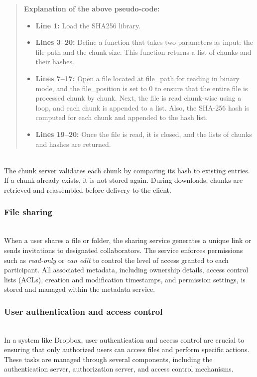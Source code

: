 \begin{quote}
\textbf{Explanation of the above pseudo-code:}

\begin{itemize}
\item
\protect{}\label{BAaoBuXCSsZ3MfwrLSQXN}
\textbf{Line 1:} Load the SHA256 library.
\item
\protect{}\label{hC2IL36w9pmnwTHtZan1t}
\textbf{Lines 3--20:} Define a function that takes two parameters as input: the file path and the chunk size. This function returns a list of chunks and their hashes.
\item
\protect{}\label{2Cv2BSsoccGaYCV5lzb3q}
\textbf{Lines 7--17:} Open a file located at file\_path for reading in binary mode, and the file\_position is set to 0 to ensure that the entire file is processed chunk by chunk. Next, the file is read chunk-wise using a loop, and each chunk is appended to a list. Also, the SHA-256 hash is computed for each chunk and appended to the hash list.
\item
\protect{}\label{w9kC0cRikaTYr6S_6Yc6u}
\textbf{Lines 19--20:} Once the file is read, it is closed, and the lists of chunks and hashes are returned.
\end{itemize}
\end{quote}
\\
The chunk server validates each chunk by comparing its hash to existing entries. If a chunk already exists, it is not stored again. During downloads, chunks are retrieved and reassembled before delivery to the client.

\subsubsection{File sharing}\label{5F435YICG2iEGXTSMBLpl}
\\
When a user shares a file or folder, the sharing service generates a unique link or sends invitations to designated collaborators. The service enforces permissions such as \emph{read-only} or \emph{can edit} to control the level of access granted to each participant. All associated metadata, including ownership details, access control lists (ACLs), creation and modification timestamps, and permission settings, is stored and managed within the metadata service.

\subsubsection{User authentication and access control}\label{A8fDbX7ZK83nq_dhzizoe}
\\
In a system like Dropbox, user authentication and access control are crucial to ensuring that only authorized users can access files and perform specific actions. These tasks are managed through several components, including the authentication server, authorization server, and access control mechanisms.

